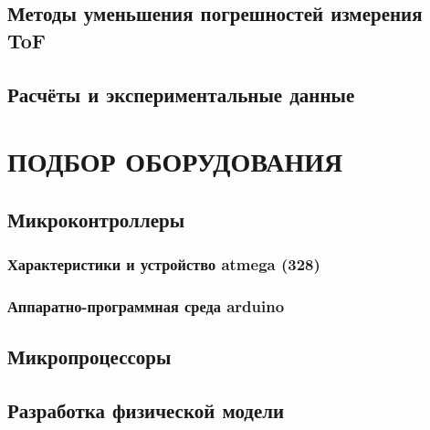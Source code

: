     \subsection{Методы уменьшения погрешностей измерения ToF}
    \label{sec:mitigation}
    

    \subsection{Расчёты и экспериментальные данные}
    \label{sec:error}
    

\section{ПОДБОР ОБОРУДОВАНИЯ}

    \subsection{Микроконтроллеры}
    \label{sec:microcontroller}
    

        \subsubsection{Характеристики и устройство atmega (328)}
        

        \subsubsection{Аппаратно-программная среда arduino}
        

    \subsection{Микропроцессоры}
    

    \subsection{Разработка физической модели}

